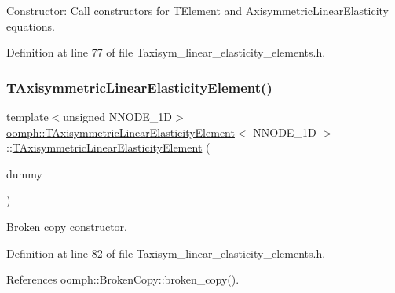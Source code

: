 Constructor\+: Call constructors for \hyperlink{classoomph_1_1TElement}{T\+Element} and Axisymmetric\+Linear\+Elasticity equations. 



Definition at line 77 of file Taxisym\+\_\+linear\+\_\+elasticity\+\_\+elements.\+h.

\mbox{\label{classoomph_1_1TAxisymmetricLinearElasticityElement_ad7aebefff103ec57124394b34a5bc73a}} 
\subsubsection{\texorpdfstring{T\+Axisymmetric\+Linear\+Elasticity\+Element()}{TAxisymmetricLinearElasticityElement()}\hspace{0.1cm}{\footnotesize\ttfamily [2/2]}}
{\footnotesize\ttfamily template$<$unsigned N\+N\+O\+D\+E\+\_\+1D$>$ \\
\hyperlink{classoomph_1_1TAxisymmetricLinearElasticityElement}{oomph\+::\+T\+Axisymmetric\+Linear\+Elasticity\+Element}$<$ N\+N\+O\+D\+E\+\_\+1D $>$\+::\hyperlink{classoomph_1_1TAxisymmetricLinearElasticityElement}{T\+Axisymmetric\+Linear\+Elasticity\+Element} (\begin{DoxyParamCaption}\item[{const \hyperlink{classoomph_1_1TAxisymmetricLinearElasticityElement}{T\+Axisymmetric\+Linear\+Elasticity\+Element}$<$ N\+N\+O\+D\+E\+\_\+1D $>$ \&}]{dummy }\end{DoxyParamCaption})\hspace{0.3cm}{\ttfamily [inline]}}



Broken copy constructor. 



Definition at line 82 of file Taxisym\+\_\+linear\+\_\+elasticity\+\_\+elements.\+h.



References oomph\+::\+Broken\+Copy\+::broken\+\_\+copy().



